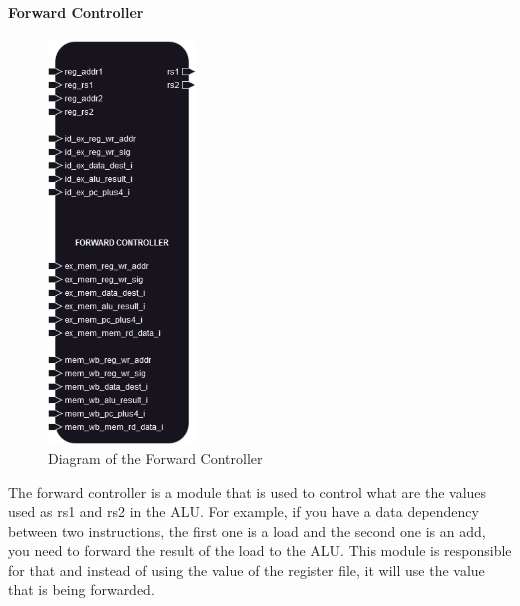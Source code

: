 \paragraph{Forward Controller}

\begin{figure}[H]
    \centering
    \includegraphics[width=0.35\textwidth]{design/pipelined/decode/images/forward_controller.png}
    \caption{Diagram of the Forward Controller}
    \label{fig:forward_controller}
\end{figure}

The forward controller is a module that is used to control what are the values used as rs1 and rs2 in the ALU. 
For example, if you have a data dependency between two instructions, the first one is a load and the second one is an add,
you need to forward the result of the load to the ALU. This module is responsible for that and instead of using the value of the register file,
it will use the value that is being forwarded. \\

